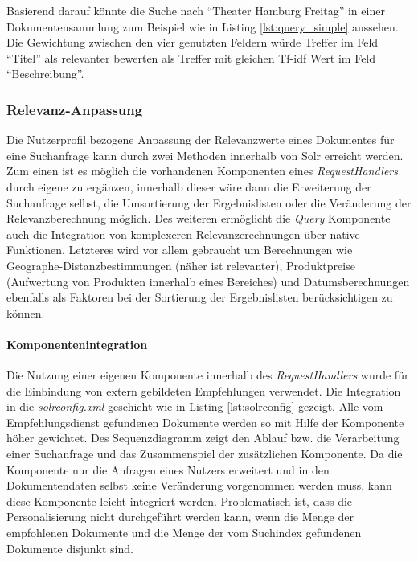 Basierend darauf könnte die Suche nach ``Theater Hamburg Freitag'' in einer Dokumentensammlung zum Beispiel wie in Listing \ref{lst:query_simple} aussehen. Die Gewichtung zwischen den vier genutzten Feldern würde Treffer im Feld ``Titel'' als relevanter bewerten als Treffer mit gleichen Tf-idf Wert im Feld ``Beschreibung''. \citep{TFIDFSimilarity}



\subsubsection{Relevanz-Anpassung}

Die Nutzerprofil bezogene Anpassung der Relevanzwerte eines Dokumentes für eine Suchanfrage kann durch zwei Methoden innerhalb von Solr erreicht werden. Zum einen ist es möglich die vorhandenen Komponenten eines \textit{RequestHandlers} durch eigene zu ergänzen, innerhalb dieser wäre dann die Erweiterung der Suchanfrage selbst, die Umsortierung der Ergebnislisten oder die Veränderung der Relevanzberechnung möglich. Des weiteren ermöglicht die \textit{Query} Komponente auch die Integration von komplexeren Relevanzerechnungen über native Funktionen. Letzteres wird vor allem gebraucht um Berechnungen wie Geographe-Distanzbestimmungen (näher ist relevanter), Produktpreise (Aufwertung von Produkten innerhalb eines Bereiches) und Datumsberechnungen ebenfalls als Faktoren bei der Sortierung der Ergebnislisten berücksichtigen zu können.

\paragraph{Komponentenintegration}  Die Nutzung einer eigenen Komponente innerhalb des \textit{RequestHandlers} wurde für die Einbindung von extern gebildeten Empfehlungen verwendet. Die Integration in die \textit{solrconfig.xml} geschieht wie in Listing \ref{lst:solrconfig} gezeigt. Alle vom Empfehlungsdienst gefundenen Dokumente werden so mit Hilfe der Komponente höher gewichtet. Des Sequenzdiagramm  zeigt den Ablauf bzw. die Verarbeitung einer Suchanfrage und das Zusammenspiel der zusätzlichen Komponente. Da die Komponente nur die Anfragen eines Nutzers erweitert und in den Dokumentendaten selbst keine Veränderung vorgenommen werden muss, kann diese Komponente  leicht integriert werden. Problematisch ist, dass die Personalisierung nicht durchgeführt werden kann, wenn die Menge der empfohlenen Dokumente und die Menge der vom Suchindex gefundenen Dokumente disjunkt sind.

